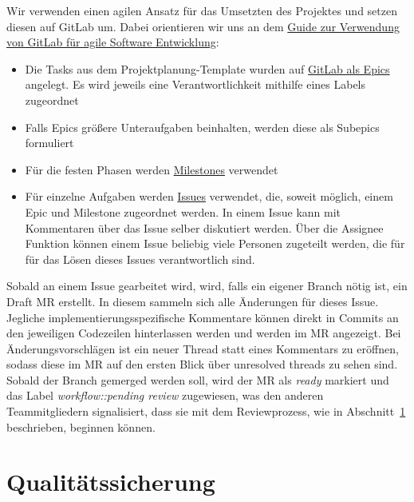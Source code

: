 Wir verwenden einen agilen Ansatz für das Umsetzten des Projektes und setzen diesen auf GitLab um.
Dabei orientieren wir uns an dem
\href{https://about.gitlab.com/blog/2018/03/05/gitlab-for-agile-software-development/}{Guide
zur Verwendung von GitLab für agile Software Entwicklung}:
\begin{itemize}
    \item Die Tasks aus dem Projektplanung-Template wurden auf
    \href{https://git.haw-hamburg.de/groups/ss21-esep-gruppe-2.3/-/epics}{GitLab als Epics} angelegt.
    Es wird jeweils eine Verantwortlichkeit mithilfe eines Labels zugeordnet
    \item Falls Epics größere Unteraufgaben beinhalten, werden diese als Subepics formuliert
    \item Für die festen Phasen werden
    \href{https://git.haw-hamburg.de/groups/ss21-esep-gruppe-2.3/-/milestones}{Milestones} verwendet
    \item Für einzelne Aufgaben werden
    \href{https://git.haw-hamburg.de/groups/ss21-esep-gruppe-2.3/-/issues}{Issues}
    verwendet, die, soweit möglich, einem Epic und Milestone zugeordnet werden.
    In einem Issue kann mit Kommentaren über das Issue selber diskutiert werden.
    Über die Assignee Funktion können einem Issue beliebig viele Personen zugeteilt werden, die für
    für das Lösen dieses Issues verantwortlich sind.
\end{itemize}
Sobald an einem Issue gearbeitet wird, wird, falls ein eigener Branch nötig ist, ein Draft MR
erstellt.
In diesem sammeln sich alle Änderungen für dieses Issue.
Jegliche implementierungsspezifische Kommentare können direkt in Commits an den jeweiligen
Codezeilen hinterlassen werden und werden im MR angezeigt.
Bei Änderungsvorschlägen ist ein neuer Thread statt eines Kommentars zu eröffnen, sodass diese im MR
auf den ersten Blick über \glqq unresolved threads\grqq{} zu sehen sind.
Sobald der Branch gemerged werden soll, wird der MR als \textit{ready} markiert und das Label
\textit{workflow::pending review} zugewiesen, was den anderen
Teammitgliedern signalisiert, dass sie mit dem Reviewprozess, wie in
Abschnitt~\ref{sec:qualitaetssicherung} beschrieben, beginnen können.


\section{Qualitätssicherung}\label{sec:qualitaetssicherung}

